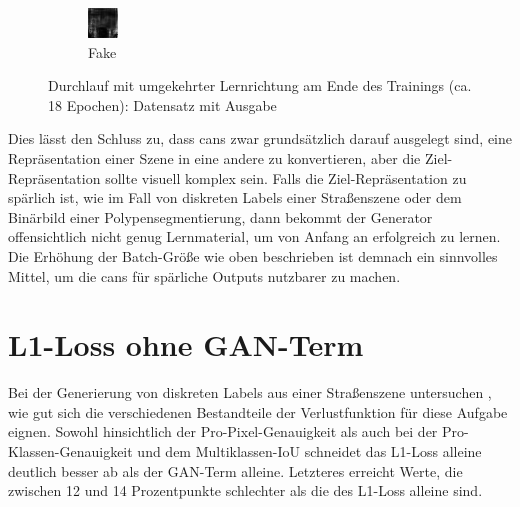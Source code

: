\begin{figure}
\begin{subfigure}{.19\textwidth}
		\includegraphics[width=.9\linewidth,interpolate=false]{img/results/btoa_fake}
		\caption{Fake}
	\end{subfigure}
	\caption{Durchlauf mit umgekehrter Lernrichtung am Ende des Trainings (ca. 18 Epochen): Datensatz mit Ausgabe}
	\label{fig:outputsbtoa}
\end{figure}

Dies lässt den Schluss zu, dass \glspl{can} zwar grundsätzlich darauf ausgelegt sind, eine Repräsentation einer Szene in eine andere zu konvertieren, aber die Ziel-Repräsentation sollte visuell komplex sein.
Falls die Ziel-Repräsentation zu spärlich ist, wie im Fall von diskreten Labels einer Straßenszene oder dem Binärbild einer Polypensegmentierung, dann bekommt der Generator offensichtlich nicht genug Lernmaterial, um von Anfang an erfolgreich zu lernen.
Die Erhöhung der Batch-Größe wie oben beschrieben ist demnach ein sinnvolles Mittel, um die \glspl{can} für spärliche Outputs nutzbarer zu machen.



\section{L1-Loss ohne GAN-Term}

Bei der Generierung von diskreten Labels aus einer Straßenszene untersuchen \citeauthor{Isola.2017}, wie gut sich die verschiedenen Bestandteile der Verlustfunktion für diese Aufgabe eignen.
Sowohl hinsichtlich der Pro-Pixel-Genauigkeit als auch bei der Pro-Klassen-Genauigkeit und dem Multiklassen-IoU schneidet das L1-Loss alleine deutlich besser ab als der GAN-Term alleine.
Letzteres erreicht Werte, die zwischen 12 und 14 Prozentpunkte schlechter als die des L1-Loss alleine sind.

